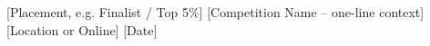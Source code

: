 

\begin{cvhonors}

  \cvhonor
    {[Placement, e.g. Finalist / Top 5\%]} %
    {[Competition Name -- one-line context]} %
    {[Location or Online]} %
    {[Date]} %

\end{cvhonors}
